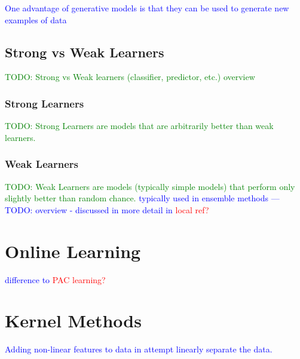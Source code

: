 \textcolor{blue}{One advantage of generative models is that they can be used to generate new examples of data}

\subsection{Strong vs Weak Learners}

\textcolor{green}{TODO: Strong vs Weak learners (classifier, predictor, etc.) overview}

\subsubsection{Strong Learners}

\textcolor{green}{TODO: Strong Learners are models that are arbitrarily better than weak learners.}

\subsubsection{Weak Learners}

\textcolor{green}{TODO: Weak Learners are models (typically simple models) that perform only slightly better than random chance.} \textcolor{blue}{typically used in ensemble methods --- TODO: overview - discussed in more detail in \textcolor{red}{local ref?}}


\section{Online Learning}

\textcolor{blue}{difference to \textcolor{red}{PAC learning?}}



\section{Kernel Methods}
\label{sec:kernel_trick}

\textcolor{blue}{Adding non-linear features to data in attempt linearly separate the data.}


